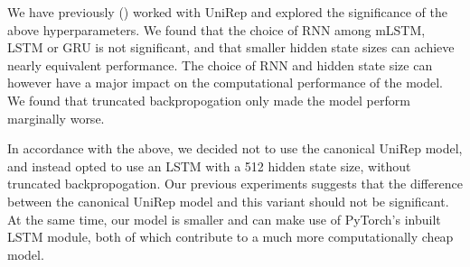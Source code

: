 We have previously () worked with UniRep and explored the significance of the above hyperparameters. We found that the choice of RNN among mLSTM, LSTM or GRU is not significant, and that smaller hidden state sizes can achieve nearly equivalent performance. The choice of RNN and hidden state size can however have a major impact on the computational performance of the model. We found that truncated backpropogation only made the model perform marginally worse. 

In accordance with the above, we decided not to use the canonical UniRep model, and instead opted to use an LSTM with a 512 hidden state size, without truncated backpropogation. Our previous experiments suggests that the difference between the canonical UniRep model and this variant should not be significant. At the same time, our model is smaller and can make use of PyTorch's inbuilt LSTM module, both of which contribute to a much more computationally cheap model.


